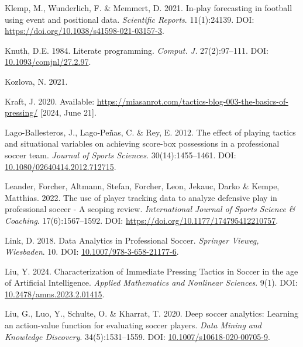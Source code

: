 \documentclass[
  a4paper,
  twoside]{uoe-thesis-template}
\newlength{\cslhangindent}
\newenvironment{CSLReferences}[2] %
 {\begin{list}{}{%
  \setlength{\itemindent}{0pt}
  \setlength{\leftmargin}{0pt}
  \setlength{\parsep}{0pt}
  \ifodd #1
   \setlength{\leftmargin}{\cslhangindent}
   \setlength{\itemindent}{-1\cslhangindent}
  \fi
  \setlength{\itemsep}{#2\baselineskip}}}
 {\end{list}}
\begin{document}
\begin{CSLReferences}{0}{0}
Klemp, M., Wunderlich, F. \& Memmert, D. 2021. In-play forecasting in
football using event and positional data. \emph{Scientific Reports}.
11(1):24139. DOI: \url{https://doi.org/10.1038/s41598-021-03157-3}.

Knuth, D.E. 1984. Literate programming. \emph{Comput. J.} 27(2):97--111.
DOI:
\href{https://doi.org/10.1093/comjnl/27.2.97}{10.1093/comjnl/27.2.97}.

Kozlova, N. 2021.

Kraft, J. 2020. Available:
\url{https://miasanrot.com/tactics-blog-003-the-basics-of-pressing/}
{[}2024, June 21{]}.

Lago-Ballesteros, J., Lago-Peñas, C. \& Rey, E. 2012. The effect of
playing tactics and situational variables on achieving score-box
possessions in a professional soccer team. \emph{Journal of Sports
Sciences}. 30(14):1455--1461. DOI:
\href{https://doi.org/10.1080/02640414.2012.712715}{10.1080/02640414.2012.712715}.

Leander, Forcher, Altmann, Stefan, Forcher, Leon, Jekauc, Darko \&
Kempe, Matthias. 2022. The use of player tracking data to analyze
defensive play in professional soccer - {A} scoping review.
\emph{International Journal of Sports Science \& Coaching}.
17(6):1567--1592. DOI: \url{https://doi.org/10.1177/174795412210757}.

Link, D. 2018. Data {Analytics} in {Professional} {Soccer}.
\emph{Springer Vieweg, Wiesbaden}. 10. DOI:
\href{https://doi.org/10.1007/978-3-658-21177-6}{10.1007/978-3-658-21177-6}.

Liu, Y. 2024. Characterization of {Immediate} {Pressing} {Tactics} in
{Soccer} in the age of {Artificial} {Intelligence}. \emph{Applied
Mathematics and Nonlinear Sciences}. 9(1). DOI:
\href{https://doi.org/10.2478/amns.2023.2.01415}{10.2478/amns.2023.2.01415}.

Liu, G., Luo, Y., Schulte, O. \& Kharrat, T. 2020. Deep soccer
analytics: Learning an action-value function for evaluating soccer
players. \emph{Data Mining and Knowledge Discovery}. 34(5):1531--1559.
DOI:
\href{https://doi.org/10.1007/s10618-020-00705-9}{10.1007/s10618-020-00705-9}.


\end{CSLReferences}
\end{document}
